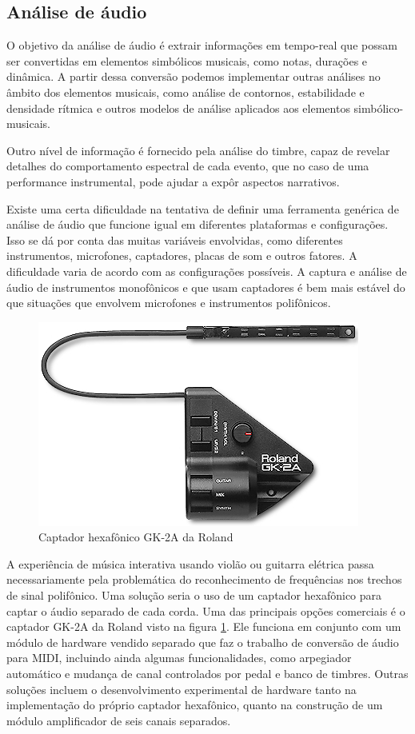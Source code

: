 \documentclass{ppgmus}
\begin{document}
\subsection{Análise de áudio}
\label{sec-audioanalise}


O objetivo da análise de áudio é extrair informações em tempo-real
que possam ser convertidas em elementos simbólicos musicais, como notas, durações e dinâmica.
A partir dessa conversão podemos implementar outras análises no 
âmbito dos elementos musicais, como análise de contornos, estabilidade e 
densidade rítmica e outros modelos de análise aplicados aos elementos
simbólico-musicais. 

Outro nível de informação é fornecido pela análise do timbre, capaz
de revelar detalhes do comportamento espectral de cada evento, que no caso de uma 
performance instrumental, pode ajudar a expôr aspectos narrativos.

Existe uma certa dificuldade na tentativa de definir uma ferramenta genérica de análise de áudio 
que funcione igual em diferentes plataformas e configurações.
Isso se dá por conta das muitas variáveis envolvidas, como diferentes instrumentos, microfones, 
captadores, placas de som e outros fatores.
A dificuldade varia de acordo com as configurações possíveis. A captura e análise de áudio
 de instrumentos monofônicos e que usam captadores é bem mais estável
do que situações que envolvem microfones e instrumentos polifônicos.

\begin{figure}
\includegraphics[scale=.5]{gk-2a}
\caption{Captador hexafônico GK-2A da Roland}
\label{gk-2a}
\end{figure} 


A experiência de música interativa usando violão ou guitarra elétrica passa necessariamente
pela problemática do reconhecimento de frequências nos trechos de sinal polifônico.
Uma solução seria o uso de um captador hexafônico para captar o áudio separado de
cada corda. Uma das principais opções comerciais é o captador GK-2A da Roland visto
na figura \ref{gk-2a}.
Ele funciona em conjunto com um módulo de hardware vendido separado que faz o trabalho de conversão 
de áudio para MIDI, incluindo ainda algumas funcionalidades, como arpegiador automático
e mudança de canal controlados por pedal  e banco de timbres.
Outras soluções incluem o desenvolvimento experimental de hardware tanto na implementação
do próprio captador hexafônico, quanto na construção de um módulo amplificador de seis
canais separados.
\end{document}
